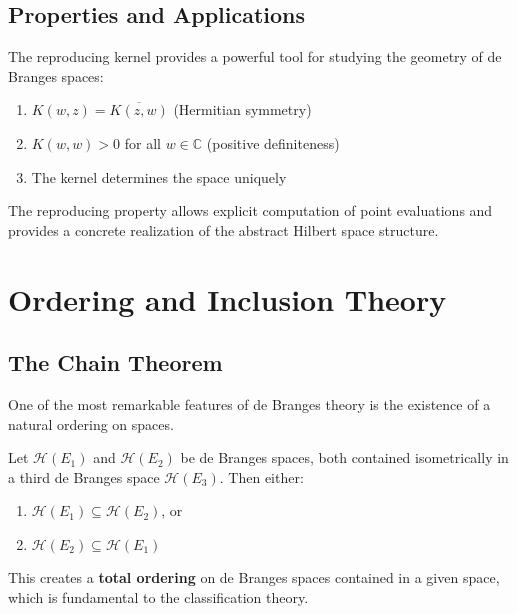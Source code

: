 \subsection{Properties and Applications}

The reproducing kernel provides a powerful tool for studying the geometry of de Branges spaces:

\begin{proposition}
\begin{enumerate}
\item $K(w,z) = \overline{K(z,w)}$ (Hermitian symmetry)
\item $K(w,w) > 0$ for all $w \in \mathbb{C}$ (positive definiteness)
\item The kernel determines the space uniquely
\end{enumerate}
\end{proposition}

The reproducing property allows explicit computation of point evaluations and provides a concrete realization of the abstract Hilbert space structure.

\section{Ordering and Inclusion Theory}
\label{sec:ordering-inclusion}

\subsection{The Chain Theorem}

One of the most remarkable features of de Branges theory is the existence of a natural ordering on spaces.

\begin{theorem}
\label{thm:chain-theorem}
Let $\mathcal{H}(E_1)$ and $\mathcal{H}(E_2)$ be de Branges spaces, both contained isometrically in a third de Branges space $\mathcal{H}(E_3)$. Then either:
\begin{enumerate}
\item $\mathcal{H}(E_1) \subseteq \mathcal{H}(E_2)$, or
\item $\mathcal{H}(E_2) \subseteq \mathcal{H}(E_1)$
\end{enumerate}
\end{theorem}

This creates a \textbf{total ordering} on de Branges spaces contained in a given space, which is fundamental to the classification theory.

